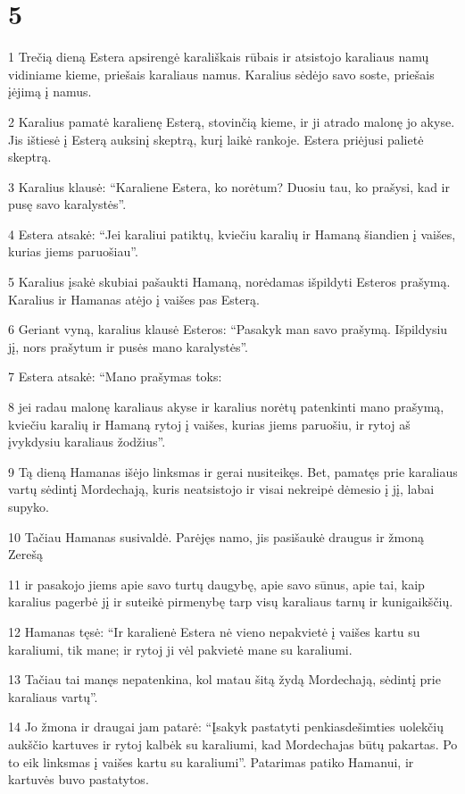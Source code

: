 \chapter{5}


\par 1 Trečią dieną Estera apsirengė karališkais rūbais ir atsistojo karaliaus namų vidiniame kieme, priešais karaliaus namus. Karalius sėdėjo savo soste, priešais įėjimą į namus. 
\par 2 Karalius pamatė karalienę Esterą, stovinčią kieme, ir ji atrado malonę jo akyse. Jis ištiesė į Esterą auksinį skeptrą, kurį laikė rankoje. Estera priėjusi palietė skeptrą. 
\par 3 Karalius klausė: “Karaliene Estera, ko norėtum? Duosiu tau, ko prašysi, kad ir pusę savo karalystės”. 
\par 4 Estera atsakė: “Jei karaliui patiktų, kviečiu karalių ir Hamaną šiandien į vaišes, kurias jiems paruošiau”. 
\par 5 Karalius įsakė skubiai pašaukti Hamaną, norėdamas išpildyti Esteros prašymą. Karalius ir Hamanas atėjo į vaišes pas Esterą. 
\par 6 Geriant vyną, karalius klausė Esteros: “Pasakyk man savo prašymą. Išpildysiu jį, nors prašytum ir pusės mano karalystės”. 
\par 7 Estera atsakė: “Mano prašymas toks: 
\par 8 jei radau malonę karaliaus akyse ir karalius norėtų patenkinti mano prašymą, kviečiu karalių ir Hamaną rytoj į vaišes, kurias jiems paruošiu, ir rytoj aš įvykdysiu karaliaus žodžius”. 
\par 9 Tą dieną Hamanas išėjo linksmas ir gerai nusiteikęs. Bet, pamatęs prie karaliaus vartų sėdintį Mordechają, kuris neatsistojo ir visai nekreipė dėmesio į jį, labai supyko. 
\par 10 Tačiau Hamanas susivaldė. Parėjęs namo, jis pasišaukė draugus ir žmoną Zerešą 
\par 11 ir pasakojo jiems apie savo turtų daugybę, apie savo sūnus, apie tai, kaip karalius pagerbė jį ir suteikė pirmenybę tarp visų karaliaus tarnų ir kunigaikščių. 
\par 12 Hamanas tęsė: “Ir karalienė Estera nė vieno nepakvietė į vaišes kartu su karaliumi, tik mane; ir rytoj ji vėl pakvietė mane su karaliumi. 
\par 13 Tačiau tai manęs nepatenkina, kol matau šitą žydą Mordechają, sėdintį prie karaliaus vartų”. 
\par 14 Jo žmona ir draugai jam patarė: “Įsakyk pastatyti penkiasdešimties uolekčių aukščio kartuves ir rytoj kalbėk su karaliumi, kad Mordechajas būtų pakartas. Po to eik linksmas į vaišes kartu su karaliumi”. Patarimas patiko Hamanui, ir kartuvės buvo pastatytos.




